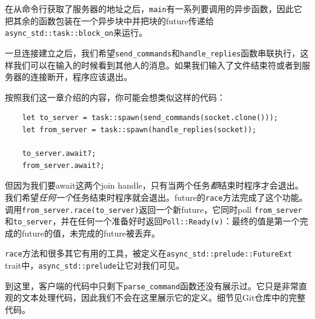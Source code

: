 在从命令行获取了服务器的地址之后，\texttt{main}有一系列要调用的异步函数，因此它把其余的函数包装在一个异步块中并把块的future传递给\texttt{async\_std::task::block\_on}来运行。

一旦连接建立之后，我们希望\texttt{send\_commands}和\texttt{handle\_replies}函数串联执行，这样我们可以在输入的时候看到其他人的消息。如果我们输入了文件结束符或者到服务器的连接断开，程序应该退出。

按照我们这一章介绍的内容，你可能会想类似这样的代码：
\begin{verbatim}
    let to_server = task::spawn(send_commands(socket.clone()));
    let from_server = task::spawn(handle_replies(socket));

    to_server.await?;
    from_server.await?;
\end{verbatim}

但因为我们要await这两个join handle，只有当两个任务\emph{都}结束时程序才会退出。我们希望\emph{任何一个}任务结束时程序就会退出。future的\texttt{race}方法完成了这个功能。调用\texttt{from\_server.race(to\_server)}返回一个新future，它同时poll \texttt{from\_server}和\texttt{to\_server}，并在任何一个准备好时返回\texttt{Poll::Ready(v)}：最终的值是第一个完成的future的值，未完成的future被丢弃。

\texttt{race}方法和很多其它有用的工具，被定义在\texttt{async\_std::prelude::FutureExt} trait中，\texttt{async\_std::prelude}让它对我们可见。

到这里，客户端的代码中只剩下\texttt{parse\_command}函数还没有展示过。它只是非常直观的文本处理代码，因此我们不会在这里展示它的定义。细节见Git仓库中的完整代码。

